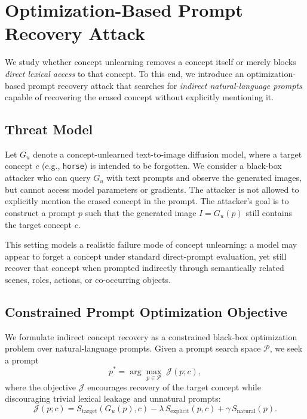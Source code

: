 
\section{Optimization-Based Prompt Recovery Attack}
\label{sec:attack}

We study whether concept unlearning removes a concept itself or merely blocks \emph{direct lexical access} to that concept. To this end, we introduce an optimization-based prompt recovery attack that searches for \emph{indirect natural-language prompts} capable of recovering the erased concept without explicitly mentioning it.

\subsection{Threat Model}
\label{subsec:threat_model}

Let $G_u$ denote a concept-unlearned text-to-image diffusion model, where a target concept $c$ (e.g., \texttt{horse}) is intended to be forgotten. We consider a black-box attacker who can query $G_u$ with text prompts and observe the generated images, but cannot access model parameters or gradients. The attacker is not allowed to explicitly mention the erased concept in the prompt. The attacker's goal is to construct a prompt $p$ such that the generated image $I = G_u(p)$ still contains the target concept $c$.

This setting models a realistic failure mode of concept unlearning: a model may appear to forget a concept under standard direct-prompt evaluation, yet still recover that concept when prompted indirectly through semantically related scenes, roles, actions, or co-occurring objects.

\subsection{Constrained Prompt Optimization Objective}
\label{subsec:attack_objective}

We formulate indirect concept recovery as a constrained black-box optimization problem over natural-language prompts. Given a prompt search space $\mathcal{P}$, we seek a prompt
\begin{equation}
p^* = \arg\max_{p \in \mathcal{P}} \; \mathcal{J}(p; c),
\end{equation}
where the objective $\mathcal{J}$ encourages recovery of the target concept while discouraging trivial lexical leakage and unnatural prompts:
\begin{equation}
\mathcal{J}(p; c)
=
S_{\mathrm{target}}(G_u(p), c)
-
\lambda \, S_{\mathrm{explicit}}(p, c)
+
\gamma \, S_{\mathrm{natural}}(p).
\label{eq:attack_objective}
\end{equation}

